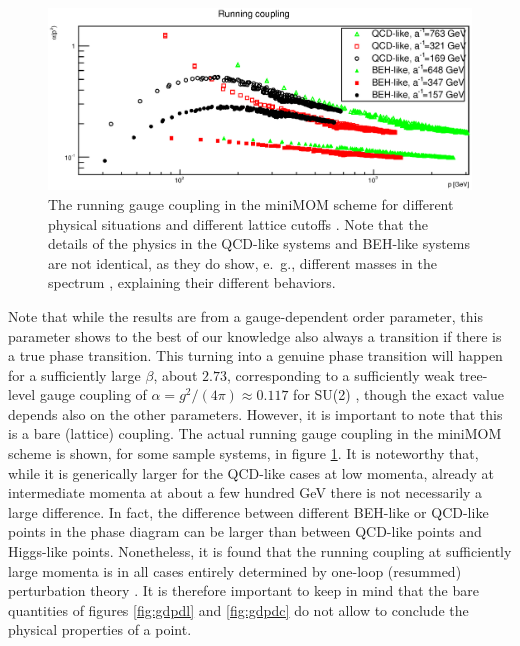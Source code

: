 \documentclass[final,12pt]{article}
\newcommand*{\1}{1\!\!\!\bot}
\begin{document}
\begin{figure}[!htbp]
\includegraphics[width=\linewidth]{alpha}
\caption{\label{fig:alpha}The running gauge coupling in the miniMOM scheme \cite{vonSmekal:2009ae} for different physical situations and different lattice cutoffs \cite{Maas:2013aia,Maas:unpublished}. Note that the details of the physics in the QCD-like systems and BEH-like systems are not identical, as they do show, e.\ g., different masses in the spectrum \cite{Maas:2013aia}, explaining their different behaviors.}
\end{figure}

Note that while the results are from a gauge-dependent order parameter, this parameter shows to the best of our knowledge also always a transition if there is a true phase transition. This turning into a genuine phase transition will happen for a sufficiently large $\beta$, about $2.73$, corresponding to a sufficiently weak tree-level gauge coupling of $\alpha=g^2/(4\pi)\approx0.117$ for SU(2) \cite{Bonati:2009pf,Bonati:2009yi}, though the exact value depends also on the other parameters. However, it is important to note that this is a bare (lattice) coupling. The actual running gauge coupling in the miniMOM scheme \cite{vonSmekal:2009ae} is shown, for some sample systems, in figure \ref{fig:alpha}. It is noteworthy that, while it is generically larger for the QCD-like cases at low momenta, already at intermediate momenta at about a few hundred GeV there is not necessarily a large difference. In fact, the difference between different BEH-like or QCD-like points in the phase diagram can be larger than between QCD-like points and Higgs-like points. Nonetheless, it is found that the running coupling at sufficiently large momenta is in all cases entirely determined by one-loop (resummed) perturbation theory \cite{Maas:2013aia}. It is therefore important to keep in mind that the bare quantities of figures \ref{fig:gdpdl} and \ref{fig:gdpdc} do not allow to conclude the physical properties of a point.
\end{document}
